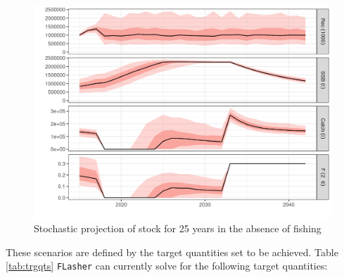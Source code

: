\documentclass[
]{book}
\begin{document}
\begin{figure}
\centering
\includegraphics{_bookdown_files/_main_files/figure-html/unnamed-chunk-124-1.png}
\caption{\label{fig:unnamed-chunk-124}Stochastic projection of stock for 25 years in the absence of fishing}
\end{figure}

These scenarios are defined by the target quantities set to be achieved. Table \ref{tab:trgqts} \texttt{FLasher} can currently solve for the following target quantities:
\end{document}
